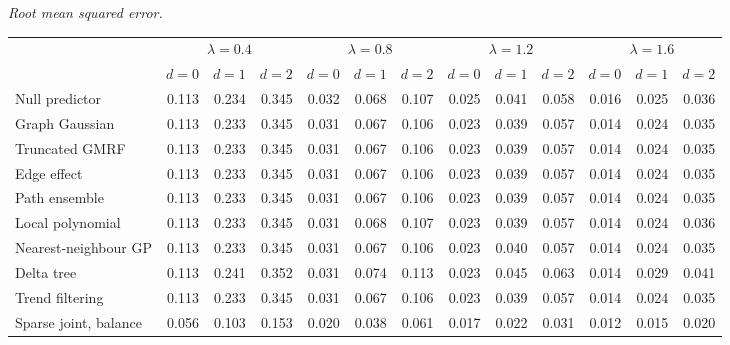 \documentclass[11pt]{article}
\begin{document}
\noindent\textit{Root mean squared error.}
\begin{center}
\footnotesize
\setlength{\tabcolsep}{3pt}
\begin{tabular}{l*{12}{r}}
\toprule
 & \multicolumn{3}{c}{$\lambda=0.4$} & \multicolumn{3}{c}{$\lambda=0.8$} & \multicolumn{3}{c}{$\lambda=1.2$} & \multicolumn{3}{c}{$\lambda=1.6$} \\
\cmidrule(lr){2-4}\cmidrule(lr){5-7}\cmidrule(lr){8-10}\cmidrule(lr){11-13}
 & $d=0$ & $d=1$ & $d=2$ & $d=0$ & $d=1$ & $d=2$ & $d=0$ & $d=1$ & $d=2$ & $d=0$ & $d=1$ & $d=2$ \\
\midrule
Null predictor & 0.113 & 0.234 & 0.345 & 0.032 & 0.068 & 0.107 & 0.025 & 0.041 & 0.058 & 0.016 & 0.025 & 0.036 \\
Graph Gaussian & 0.113 & 0.233 & 0.345 & 0.031 & 0.067 & 0.106 & 0.023 & 0.039 & 0.057 & 0.014 & 0.024 & 0.035 \\
Truncated GMRF & 0.113 & 0.233 & 0.345 & 0.031 & 0.067 & 0.106 & 0.023 & 0.039 & 0.057 & 0.014 & 0.024 & 0.035 \\
Edge effect & 0.113 & 0.233 & 0.345 & 0.031 & 0.067 & 0.106 & 0.023 & 0.039 & 0.057 & 0.014 & 0.024 & 0.035 \\
Path ensemble & 0.113 & 0.233 & 0.345 & 0.031 & 0.067 & 0.106 & 0.023 & 0.039 & 0.057 & 0.014 & 0.024 & 0.035 \\
Local polynomial & 0.113 & 0.233 & 0.345 & 0.031 & 0.068 & 0.107 & 0.023 & 0.039 & 0.057 & 0.014 & 0.024 & 0.036 \\
Nearest-neighbour GP & 0.113 & 0.233 & 0.345 & 0.031 & 0.067 & 0.106 & 0.023 & 0.040 & 0.057 & 0.014 & 0.024 & 0.035 \\
Delta tree & 0.113 & 0.241 & 0.352 & 0.031 & 0.074 & 0.113 & 0.023 & 0.045 & 0.063 & 0.014 & 0.029 & 0.041 \\
Trend filtering & 0.113 & 0.233 & 0.345 & 0.031 & 0.067 & 0.106 & 0.023 & 0.039 & 0.057 & 0.014 & 0.024 & 0.035 \\
Sparse joint, balance & 0.056 & 0.103 & 0.153 & 0.020 & 0.038 & 0.061 & 0.017 & 0.022 & 0.031 & 0.012 & 0.015 & 0.020 \\
\bottomrule
\end{tabular}
\end{center}
\end{document}
